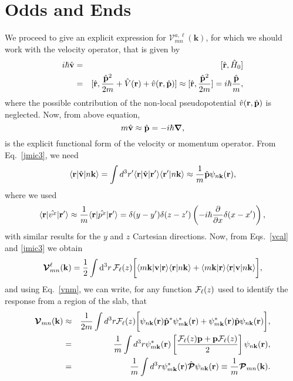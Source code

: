 \section{Odds and Ends}
We proceed to give an explicit expression for 
$\mathcal{V}^{a,\ell}_{mn}(\mathbf{k})$,
for which we should work with  
the velocity operator, that is given by
\begin{eqnarray}\label{vop2} 
i\hbar\hat{\mathbf{v}}&=&[\hat{\mathbf{r}},\hat{H}_0]
\nonumber\\
&=&
[\hat{\mathbf{r}},\frac{\hat{\mathbf{p}}^2}{2m} +
\hat{V}(\mathbf{r})+\hat{v}(\mathbf{r},\hat{\mathbf{p}})]
\approx
[\hat{\mathbf{r}},\frac{\hat{\mathbf{p}}^2}{2m}]=i\hbar\frac{\hat{\mathbf{p}}}{m},
\end{eqnarray} 
where the possible contribution of 
the non-local pseudopotential $\hat{v}(\mathbf{r},\hat{\mathbf{p}})$
is neglected. Now, from above equation,
\begin{equation}\label{velo}
m\hat{\mathbf{v}}\approx\hat{\mathbf{p}}=-i\hbar\boldsymbol{\mathcal {\nabla}},
\end{equation}
is the explicit functional form of the velocity or momentum operator.
From Eq.~\eqref{jmic3}, we need 
\begin{equation}\label{vnm}
\langle \mathbf{r} | \hat{\mathbf v} | n\mathbf{k} \rangle
=\int d^3 r' \langle \mathbf{r} |\hat{\mathbf{v}}| \mathbf{r}' \rangle
\langle {\mathbf{r}'} | {n\mathbf{k}} \rangle
\approx\frac{1}{m}\hat{\mathbf{p}}\psi_{n\mathbf{k}}(\mathbf{r}),
\end{equation} 
where we used 
\begin{equation}\label{rvnk}
\langle \mathbf{r} |\hat{v^x}| \mathbf{r}' \rangle
\approx \frac{1}{m}\langle \mathbf{r} |\hat{p^x}| \mathbf{r}' \rangle
=
\delta(y-y')\delta(z-z')\left(-i\hbar\frac{\partial}{\partial x}\delta(x-x')\right),
\end{equation}
with similar results for the $y$ and $z$ Cartesian directions.
Now, from 
Eqs.~\eqref{vcal} and \eqref{jmic3} we obtain
\begin{equation}
{\boldsymbol{\mathcal{V}}}^{\ell}_{mn}({\mathbf k})=
\frac{1}{2}
\int \mathrm{d}^3 r\,
 {\mathbf{\cal F}}_\ell(z)
\bigg[
\langle m\mathbf{k}|\mathbf{v} | \mathbf{r}\rangle
\langle \mathbf{r} | n \mathbf k \rangle +
\langle m\mathbf{k} | \mathbf{r}\rangle
\langle \mathbf{r} | \mathbf{v} | n \mathbf k \rangle\bigg],
\label{intj}
\end{equation}   
and using Eq.~\eqref{vnm},
we can write, for any  function ${\mathbf{\cal F}}_\ell(z)$ used
to identify the response from a region of the slab, that
\begin{eqnarray}\label{pofs}
{\boldsymbol{\mathcal{V}}}_{mn}(\mathbf{k})&\approx&
\frac{1}{2m}\int d^3 r
{\mathbf{\cal F}}_\ell(z)
 \bigg[
\psi_{n\mathbf{k}}(\mathbf{r})
\hat{\mathbf{p}}^*\psi^*_{m\mathbf{k}}(\mathbf{r})
+ 
\psi^*_{m\mathbf{k}}(\mathbf{r})\hat{\mathbf{p}}
\psi_{n\mathbf{k}}(\mathbf{r})
\bigg], \label{pofs1}  \\
&=&
\frac{1}{m}\int d^3 r
\psi^*_{m\mathbf{k}}(\mathbf{r})
\left[\frac{{\mathbf{\cal F}}_\ell(z) \mathbf{p} +
\mathbf{p} {\mathbf{\cal F}}_\ell(z)}{2}\right]
\psi_{n\mathbf{k}}(\mathbf{r})
,\label{pofs2} \\
&=&\frac{1}{m}\int d^3 r
\psi^*_{m\mathbf{k}}(\mathbf{r})\hat{\boldsymbol{\mathcal{P}}}
\psi_{n\mathbf{k}}(\mathbf{r})\equiv \frac{1}{m}{\boldsymbol{\mathcal{P}}}_{mn}(\mathbf{k}).
\end{eqnarray}
